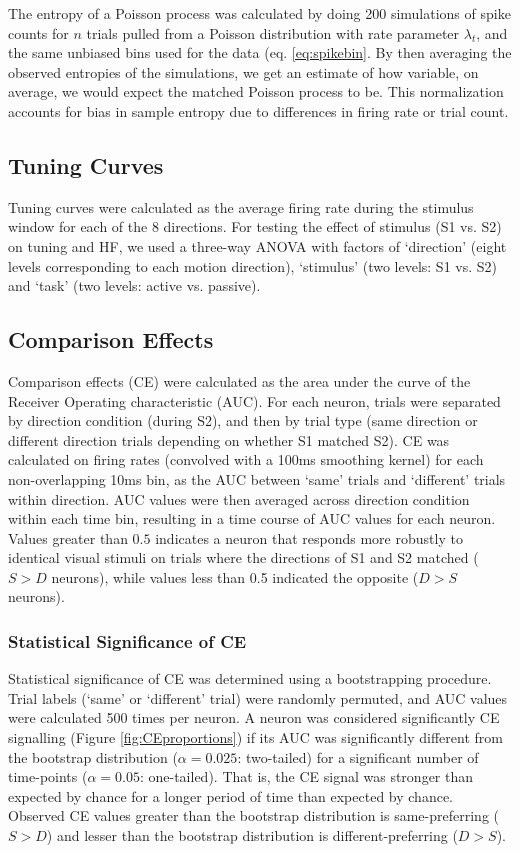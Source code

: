 The entropy of a Poisson process was calculated by doing 200 simulations of spike counts for $n$ trials pulled from a Poisson distribution with rate parameter $\lambda _t$, and the same unbiased bins used for the data (eq. \ref{eq:spikebin}. By then averaging the observed entropies of the simulations, we get an estimate of how variable, on average, we would expect the matched Poisson process to be. This normalization accounts for bias in sample entropy due to differences in firing rate or trial count. 

\subsection*{Tuning Curves}
Tuning curves were calculated as the average firing rate during the stimulus window for each of the 8 directions. For testing the effect of stimulus (S1 vs. S2) on tuning and HF, we used a three-way ANOVA with factors of `direction' (eight levels corresponding to each motion direction), `stimulus' (two levels: S1 vs. S2) and `task' (two levels: active vs. passive).


\subsection*{Comparison Effects}
Comparison effects (CE) were calculated as the area under the curve of the Receiver Operating characteristic (AUC). For each neuron, trials were separated by direction condition (during S2), and then by trial type (same direction or different direction trials depending on whether S1 matched S2). CE was calculated on firing rates (convolved with a 100ms smoothing kernel) for each non-overlapping 10ms bin, as the AUC between `same' trials and `different' trials within direction. AUC values were then averaged across direction condition within each time bin, resulting in a time course of AUC values for each neuron. Values greater than $0.5$ indicates a neuron that responds more robustly to identical visual stimuli on trials where the directions of S1 and S2 matched ($S>D$ neurons), while values less than 0.5 indicated the opposite ($D>S$ neurons). 

\subsubsection*{Statistical Significance of CE}
Statistical significance of CE was determined using a bootstrapping procedure. Trial labels (`same' or `different' trial) were randomly permuted, and AUC values were calculated 500 times per neuron. A neuron was considered significantly CE signalling (Figure \ref{fig:CEproportions}) if its AUC was significantly different from the bootstrap distribution ($\alpha=0.025$: two-tailed) for a significant number of time-points ($\alpha=0.05$: one-tailed). That is, the CE signal was stronger than expected by chance for a longer period of time than expected by chance. Observed CE values greater than the bootstrap distribution is same-preferring ($S>D$) and lesser than the bootstrap distribution is different-preferring ($D>S$).

